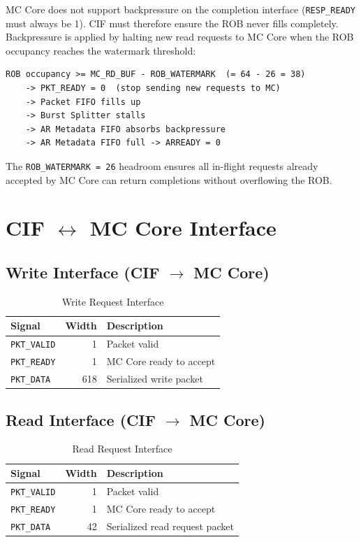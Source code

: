 \documentclass[11pt, a4paper]{article}
\begin{document}
MC Core does not support backpressure on the completion interface (\texttt{RESP\_READY} must always be 1). CIF must therefore ensure the ROB never fills completely. Backpressure is applied by halting new read requests to MC Core when the ROB occupancy reaches the watermark threshold:

\begin{lstlisting}
ROB occupancy >= MC_RD_BUF - ROB_WATERMARK  (= 64 - 26 = 38)
    -> PKT_READY = 0  (stop sending new requests to MC)
    -> Packet FIFO fills up
    -> Burst Splitter stalls
    -> AR Metadata FIFO absorbs backpressure
    -> AR Metadata FIFO full -> ARREADY = 0
\end{lstlisting}

The \texttt{ROB\_WATERMARK = 26} headroom ensures all in-flight requests already accepted by MC Core can return completions without overflowing the ROB.

\section{CIF \texorpdfstring{$\leftrightarrow$}{<->} MC Core Interface}

\subsection{Write Interface (CIF \texorpdfstring{$\rightarrow$}{->} MC Core)}

\begin{table}[h]
\centering
\begin{tabular}{lrl}
\toprule
\textbf{Signal} & \textbf{Width} & \textbf{Description} \\
\midrule
\texttt{PKT\_VALID} & 1   & Packet valid \\
\texttt{PKT\_READY} & 1   & MC Core ready to accept \\
\texttt{PKT\_DATA}  & 618 & Serialized write packet \\
\bottomrule
\end{tabular}
\caption{Write Request Interface}
\end{table}

\subsection{Read Interface (CIF \texorpdfstring{$\rightarrow$}{->} MC Core)}

\begin{table}[h]
\centering
\begin{tabular}{lrl}
\toprule
\textbf{Signal} & \textbf{Width} & \textbf{Description} \\
\midrule
\texttt{PKT\_VALID} & 1  & Packet valid \\
\texttt{PKT\_READY} & 1  & MC Core ready to accept \\
\texttt{PKT\_DATA}  & 42 & Serialized read request packet \\
\bottomrule
\end{tabular}
\caption{Read Request Interface}
\end{table}
\end{document}
